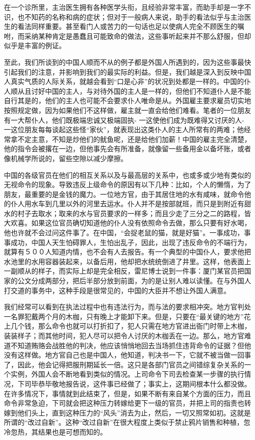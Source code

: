 \documentclass[12pt,oneside]{book}
\begin{document}
\begin{common-format}
在一个诊所里，主治医生拥有各种医学头衔，且经验非常丰富，而助手却是一字不识，也不知药的名称和病的症状；但对于一般病人来说，助手的看法似乎与主治医生的看法同样重要。甚至看门人或苦力的一句话也足以使病人完全不顾医生的嘱咐，而采纳某种肯定是愚蠢且可能致命的做法，这些事听起来并不那么舒服，但却似乎是丰富的例证。 

至此，我们所谈到的中国人顺而不从的例子都是外国人所遇到的，因为这些事最快引起我们的注意，并影响到我们的最实际的利益。但是，我们越是深入到反映中国人真实气质的人际关系，就越会看到“口是心非”的状况到处都是一样的。中国的仆人顺从且讨好中国的主人，与对待外国的主人是一样的，但他们不知道仆人是不能自行其是的，他们的主人也可能不会要求仆人唯命是从。外国雇主要求雇员切实地按照规定做，因为如果他们不这样做，雇主就一直会给他们难看。笔者的一位朋友有一大帮仆人，他们既极端忠诚又极端固执- 一这使他们成为既难得又讨厌的人- 一这位朋友每每谈起这些怪“家伙”，就表现出这类仆人的主人所常有的两难；他经常拿不定主意，不知是炒他们的鱿鱼呢，还是给他们加薪！中国的雇主完全清楚，他的指令会被撂在一边，但他事先会有所准备，就像留一些备用金以备坏账，或者像机械学所说的，留些空隙以减少摩擦。 

中国的各级官员在他们的相互关系以及与最高层的关系中，也或多或少地有类似的无视命令的现象。导致违反上级命令的原因有以下几种：比如，个人的懒惰，为了朋友，最重要的是金钱的魔力。一位地方官，由于其居住地的水有咸味，就命令他的仆人用水车到几里以外的河里去运水。仆人并不是按部就班，而只是到附近有甜水的村子去取水；取来的水与官员要求的一样多；而且少走了三分之二的路程，皆大欢喜。如果这位官员确切知道他的仆人没有依照命令去做，那么只要有好水喝，他也许就不会过问这件事了。在中国，“会捉老鼠的猫，就是好猫”。一事成功，事事成功，中国人天生怕碍罪人，生怕出乱子，因此，出现了违反命令的不端行为，就算有５００人知道内情，也不会有人去报告。有一个典型的中国仆人，要求他把水池里的水用容器装起来，以备后用，他却把水统统倒进了井里。这样，他表面上一副顺从的样子，而实际上却是完全相反，雷尼博士说到一件事：厦门某官员把国家的公文分成两部分，把后半部分放到前面，为的是让别人难以读懂。在与外国人打交道的事务中，这种手段是很常见的，中国的大臣并不想让外国人满意。 

我们经常可以看到在执法过程中也有违法行为，而与法的要求相冲突。地方官判处一名罪犯戴两个月的木枷，只有晚上才能卸下来。但是，只要在“最关键的地方”花上几个钱，那么命令也就可以打折扣了，犯人只需在地方官进出衙门时带上木枷，装装样子；而其他时间，犯人尽可以把令人讨厌的木枷丢在一边。那么，地方官难道不知道贿赂会战胜他的判决，他应该悄悄地回去当场抓住违背命令的证据？但他没有这样做。地方官自己也是中国人，他知道，判决书一下，它就不被当做一回事了，因此，他会记得把服刑期延长一倍。这只是各部门官员之间错综复杂关系的一个实例，外国人会不断地看到类似的情况。上司命令下司去检查某一步骤的执行情况，下司毕恭毕敬地报告说，这件事已经做了；事实上，这期间根本什么都没做。在许多情况下，事情就到此结束了，但是，如果不断有来自某个方面的压力，而且命令非常急迫，下司就会把这种压力转嫁给更下一级的官员，并把上司的指责也转嫁到他们头上，直到这种压力的“风头”消去为止，然后，一切又照常如初。这就是所谓的“改过自新”。这种“改过自新”在很大程度上类似于禁止鸦片销售和种植，忽冷忽热，其结果也是可想而知的。 


\end{common-format}
\end{document}
